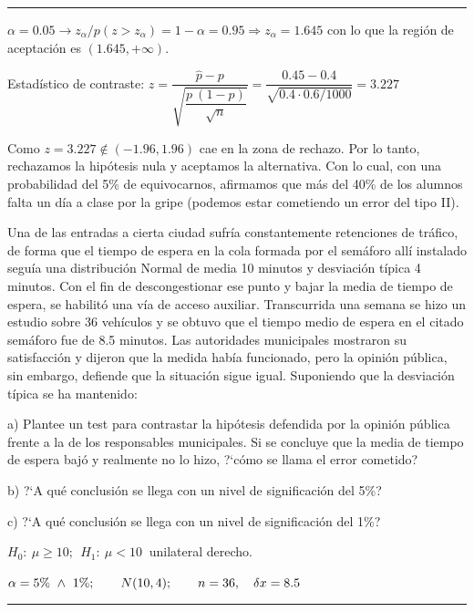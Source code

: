 \rule{150pt}{0.1pt}

$\alpha=0.05 \to z_\alpha / p(z>z_\alpha)=1-\alpha=0.95 \Rightarrow z_\alpha=1.645$ con lo que la región de aceptación es $(1.645,+\infty)$.

Estadístico de contraste: $z=\dfrac{\widehat p -p}{\sqrt{\dfrac{p\ (1-p)}{\sqrt{n}}}}=
\dfrac{0.45 - 0.4}{\sqrt{0.4 \cdot 0.6/1000}}=3.227$
 
 
 Como $z=3.227 \notin (-1.96,1.96)$ cae en la zona de rechazo. Por lo tanto, rechazamos la hipótesis nula y aceptamos la alternativa. Con lo cual, con una probabilidad del 5\% de equivocarnos, afirmamos que más del 40\% de los alumnos falta un día a clase por la gripe (podemos estar cometiendo un error del tipo II).




\vspace{4mm}
\begin{ejemplo}
\begin{ejer}
	Una de las entradas a cierta ciudad sufría constantemente retenciones de tráfico, de forma que el tiempo de espera en la cola formada por el semáforo allí instalado seguía una distribución Normal de media 10 minutos y desviación típica 4 minutos. Con el fin de descongestionar ese punto y bajar la media de tiempo de espera, se habilitó una vía de acceso auxiliar. Transcurrida una semana se hizo un estudio sobre 36 vehículos y se obtuvo que el tiempo medio de espera en el citado semáforo fue de 8.5 minutos. Las autoridades municipales mostraron su satisfacción y dijeron que la medida había funcionado, pero la opinión pública, sin embargo, defiende que la situación sigue igual. Suponiendo que la desviación típica se ha mantenido:
	
a) Plantee un test para contrastar la hipótesis defendida por la opinión pública frente a la de los responsables municipales. Si se concluye que la media de tiempo de espera bajó y realmente no lo hizo, ?`cómo se llama el error cometido?

b) ?`A qué conclusión se llega con un nivel de significación del 5\%?

c) ?`A qué conclusión se llega con un nivel de significación del 1\%?
\end{ejer}
\end{ejemplo}

$H_0:\ \mu \ge 10;\ \ H_1:\ \mu<10\ $ unilateral derecho.

$\alpha=5\% \ \wedge \ 1\%;\qquad N(10,4);\qquad n=36,\ \ \ \var x=8.5$

\rule{150pt}{0.1pt}

